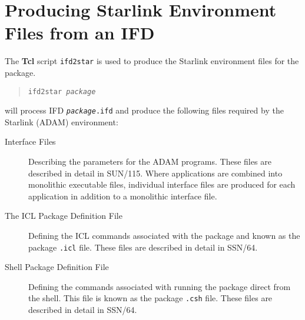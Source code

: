 \documentclass[twoside,11pt]{article}
\newcommand{\xref}[3]{#1}
\newcommand{\xlabel}[1]{}
\begin{document}
\section{\label{ifd2star}\xlabel{producing_starlink_environment_files_from_an_ifd}Producing 
Starlink Environment Files from an IFD}
The \textbf{Tcl} script \texttt{ifd2star} is used to produce the Starlink 
environment files for the package. 
\begin{quote}
\texttt{ifd2star \textit{package}}
\end{quote}
will process IFD \texttt{\textit{package}.ifd} and produce the following files
required by the Starlink (ADAM) environment:
\begin{description}
\item[Interface Files] Describing the parameters for the ADAM programs.
These files are described in detail in
\xref{SUN/115}{sun115}{}.
Where applications are combined into monolithic executable files, individual
interface files are produced for each application in addition to a monolithic 
interface file.
\item[The \xref{ICL}{sg5}{} Package Definition File] Defining the ICL commands 
associated with the package and known as the package \texttt{.icl} file.
These files are described in detail in
\xref{SSN/64}{ssn64}{}.
\item[Shell Package Definition File] Defining the commands associated with 
running the package direct from the shell. This file is known as the 
package \texttt{.csh} file.
These files are described in detail in
\xref{SSN/64}{ssn64}{}.
\end{description}
\end{document}
